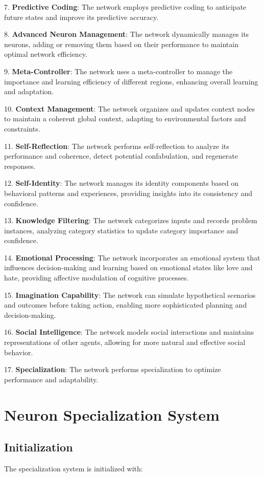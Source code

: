 \documentclass{article}
\begin{document}
7. \textbf{Predictive Coding}: The network employs predictive coding to anticipate future states and improve its predictive accuracy.

8. \textbf{Advanced Neuron Management}: The network dynamically manages its neurons, adding or removing them based on their performance to maintain optimal network efficiency.

9. \textbf{Meta-Controller}: The network uses a meta-controller to manage the importance and learning efficiency of different regions, enhancing overall learning and adaptation.

10. \textbf{Context Management}: The network organizes and updates context nodes to maintain a coherent global context, adapting to environmental factors and constraints.

11. \textbf{Self-Reflection}: The network performs self-reflection to analyze its performance and coherence, detect potential confabulation, and regenerate responses.

12. \textbf{Self-Identity}: The network manages its identity components based on behavioral patterns and experiences, providing insights into its consistency and confidence.

13. \textbf{Knowledge Filtering}: The network categorizes inputs and records problem instances, analyzing category statistics to update category importance and confidence.

14. \textbf{Emotional Processing}: The network incorporates an emotional system that influences decision-making and learning based on emotional states like love and hate, providing affective modulation of cognitive processes.

15. \textbf{Imagination Capability}: The network can simulate hypothetical scenarios and outcomes before taking action, enabling more sophisticated planning and decision-making.

16. \textbf{Social Intelligence}: The network models social interactions and maintains representations of other agents, allowing for more natural and effective social behavior.

17. \textbf{Specialization}: The network performs specialization to optimize performance and adaptability.

\section{Neuron Specialization System}

\subsection{Initialization}
The specialization system is initialized with:
\end{document}
